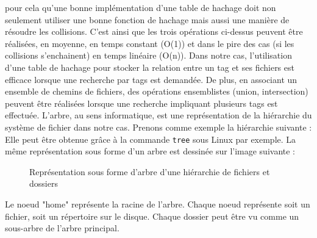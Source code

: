 \documentclass[a4paper, 12pt]{article}
\begin{document}
pour cela qu'une bonne implémentation d'une table de hachage doit non seulement utiliser une bonne 
fonction de hachage mais aussi une manière de résoudre les collisions. C'est ainsi que les trois 
opérations ci-dessus peuvent être réalisées, en moyenne, en temps constant (O(1)) et dans le pire 
des cas (si les collisions s'enchainent) en temps linéaire (O(n)). Dans notre cas, l'utilisation 
d'une table de hachage pour stocker la relation entre un tag et ses fichiers est efficace lorsque 
une recherche par tags est demandée. De plus, en associant un ensemble de chemins de fichiers, 
des opérations ensemblistes (union, intersection) peuvent être réalisées lorsque une recherche 
impliquant plusieurs tags est effectuée.
\bigbreak
L'arbre, au sens informatique, est une représentation de la hiérarchie du système de fichier dans 
notre cas. Prenons comme exemple la hiérarchie suivante :
Elle peut être obtenue grâce à la commande \texttt{tree} sous Linux par exemple.
La même représentation sous forme d'un arbre est dessinée sur l'image suivante :
\begin{figure}
    \begin{center}
    \end{center}
    \caption{Représentation sous forme d'arbre d'une hiérarchie de fichiers et dossiers}
\end{figure}
Le noeud "home" représente la racine de l'arbre. Chaque noeud représente soit un fichier, soit 
un répertoire sur le disque. Chaque dossier peut être vu comme un sous-arbre de l'arbre principal.
\end{document}
